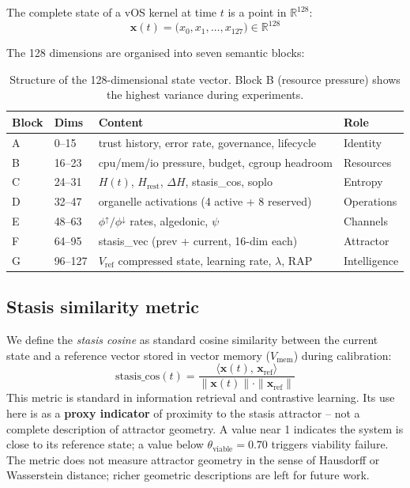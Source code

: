 \documentclass[11pt, a4paper]{article}
\newcommand{\R}{\mathbb{R}}
\newcommand{\sv}{\bm{x}}
\newcommand{\vOS}{\textsf{vOS}}
\begin{document}
The complete state of a \vOS{} kernel at time $t$ is a point in $\R^{128}$:
\begin{equation}
  \sv(t) = \bigl(x_0, x_1, \ldots, x_{127}\bigr) \in \R^{128}
\end{equation}

The 128 dimensions are organised into seven semantic blocks:

\begin{table}[h]
\centering
\small
\begin{tabular}{llll}
\toprule
Block & Dims & Content & Role \\
\midrule
A & 0--15   & trust history, error rate, governance, lifecycle & Identity \\
B & 16--23  & cpu/mem/io pressure, budget, cgroup headroom   & Resources \\
C & 24--31  & $H(t)$, $H_\text{rest}$, $\Delta H$, stasis\_cos, soplo & Entropy \\
D & 32--47  & organelle activations (4 active + 8 reserved)  & Operations \\
E & 48--63  & $\phi^\uparrow/\phi^\downarrow$ rates, algedonic, $\psi$ & Channels \\
F & 64--95  & stasis\_vec (prev + current, 16-dim each)       & Attractor \\
G & 96--127 & $V_\text{ref}$ compressed state, learning rate, $\lambda$, RAP & Intelligence \\
\bottomrule
\end{tabular}
\caption{Structure of the 128-dimensional state vector.
Block B (resource pressure) shows the highest variance during experiments.}
\label{tab:blocks}
\end{table}

\subsection{Stasis similarity metric}
\label{sec:stasis_cos}

We define the \emph{stasis cosine} as standard cosine similarity between
the current state and a reference vector stored in vector memory ($V_\text{mem}$)
during calibration:
\begin{equation}
  \text{stasis\_cos}(t)
    = \frac{\langle \sv(t),\, \sv_\text{ref} \rangle}
           {\|\sv(t)\| \cdot \|\sv_\text{ref}\|}
  \label{eq:stasis_cos}
\end{equation}
This metric is standard in information retrieval and contrastive learning.
Its use here is as a \textbf{proxy indicator} of proximity to the stasis
attractor -- not a complete description of attractor geometry.
A value near 1 indicates the system is close to its reference state;
a value below $\theta_\text{viable} = 0.70$ triggers viability failure.
The metric does not measure attractor geometry in the sense of Hausdorff or
Wasserstein distance; richer geometric descriptions are left for future work.
\end{document}
